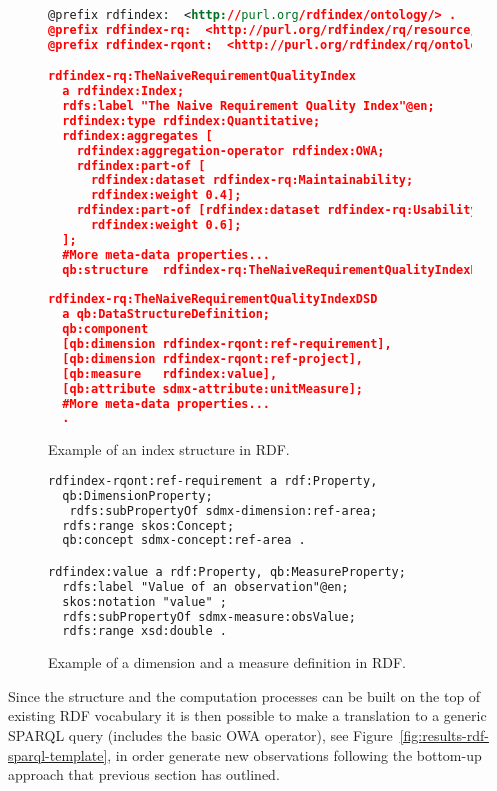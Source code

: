 \begin{figure}[!ht]
\begin{lstlisting}[language=XML,basicstyle=\scriptsize]  
@prefix rdfindex:  <http://purl.org/rdfindex/ontology/> .
@prefix rdfindex-rq:  <http://purl.org/rdfindex/rq/resource/> .
@prefix rdfindex-rqont:  <http://purl.org/rdfindex/rq/ontology/> .

rdfindex-rq:TheNaiveRequirementQualityIndex
  a rdfindex:Index;
  rdfs:label "The Naive Requirement Quality Index"@en;
  rdfindex:type rdfindex:Quantitative;
  rdfindex:aggregates [ 		
    rdfindex:aggregation-operator rdfindex:OWA;
    rdfindex:part-of [
      rdfindex:dataset rdfindex-rq:Maintainability; 
      rdfindex:weight 0.4];
    rdfindex:part-of [rdfindex:dataset rdfindex-rq:Usability; 
      rdfindex:weight 0.6];
  ];
  #More meta-data properties...
  qb:structure 	rdfindex-rq:TheNaiveRequirementQualityIndexDSD ; .
  
rdfindex-rq:TheNaiveRequirementQualityIndexDSD 
  a qb:DataStructureDefinition;  
  qb:component    
  [qb:dimension rdfindex-rqont:ref-requirement],
  [qb:dimension rdfindex-rqont:ref-project],
  [qb:measure   rdfindex:value],
  [qb:attribute sdmx-attribute:unitMeasure];
  #More meta-data properties...
  .
\end{lstlisting}
\caption{Example of an index structure in RDF.}
 \label{fig:results-rdf-index}
\end{figure}

\begin{figure}[!ht]
\begin{lstlisting}[language=XML,basicstyle=\scriptsize]  
rdfindex-rqont:ref-requirement a rdf:Property, 
  qb:DimensionProperty; 
   rdfs:subPropertyOf sdmx-dimension:ref-area; 
  rdfs:range skos:Concept; 
  qb:concept sdmx-concept:ref-area . 

rdfindex:value a rdf:Property, qb:MeasureProperty;
  rdfs:label "Value of an observation"@en;
  skos:notation "value" ;
  rdfs:subPropertyOf sdmx-measure:obsValue;
  rdfs:range xsd:double . 
\end{lstlisting}
\caption{Example of a dimension and a measure definition in RDF.}
 \label{fig:results-rdf-properties}
\end{figure}


Since the structure and the computation processes can be built on the top of existing RDF vocabulary it is then 
possible to make a translation to a generic SPARQL query (includes the basic OWA operator), see Figure~\ref{fig:results-rdf-sparql-template}, 
in order generate new observations following the bottom-up approach that previous section has outlined.

